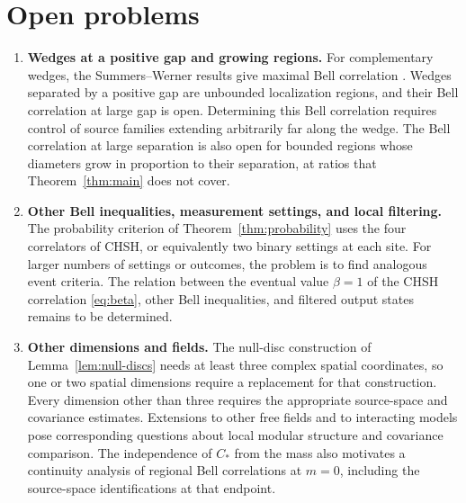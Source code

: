 \documentclass[11pt]{amsart}
\numberwithin{equation}{section}
\theoremstyle{definition}
\begin{document}
\section{Open problems}\label{sec:discussion}

\begin{enumerate}[label=\textup{(\arabic*)},leftmargin=*]
\item \textbf{Wedges at a positive gap and growing regions.}
For complementary wedges, the Summers--Werner results give maximal
Bell correlation \cite{SW87c,SW88}. Wedges separated by a positive gap
are unbounded localization regions, and their Bell correlation at large
gap is open. Determining this Bell correlation requires control of
source families extending arbitrarily far along the wedge. The Bell
correlation at large
separation is also open for bounded regions whose diameters grow in
proportion to their separation, at ratios that Theorem~\ref{thm:main}
does not cover.

\item \textbf{Other Bell inequalities, measurement settings, and local filtering.}
The probability criterion of Theorem~\ref{thm:probability} uses the
four correlators of CHSH, or equivalently two binary settings at each
site. For larger numbers of settings or outcomes, the problem is to
find analogous event criteria.
The relation between the eventual value \(\beta=1\) of the CHSH
correlation \eqref{eq:beta}, other Bell inequalities, and filtered output
states remains to be determined.

\item \textbf{Other dimensions and fields.}
The null-disc construction of Lemma~\ref{lem:null-discs} needs at least
three complex spatial coordinates, so one or two spatial dimensions
require a replacement for that construction. Every dimension other than three
requires the appropriate source-space and covariance estimates. Extensions to
other free fields and to interacting models pose corresponding
questions about local modular structure and covariance comparison.
The independence of \(C_*\) from the mass also motivates a continuity
analysis of regional Bell correlations at \(m=0\), including the
source-space identifications at that endpoint.


\end{enumerate}
\end{document}
